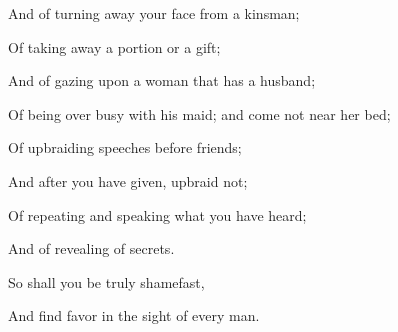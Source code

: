{\par }{\Q {}And of turning away
 your face from a kinsman;
\par }{\Q Of taking away a portion or a gift;
\par }{\Q And of gazing upon a woman that has a husband;
\par }{\Q {}Of being over busy with his maid; and come not near her bed;
\par }{\Q Of upbraiding speeches before friends;
\par }{\Q And after you have given, upbraid not;
\par }{\Q {}Of repeating and speaking what you have heard;
\par }{\Q And of revealing of secrets.
\par }{\Q {}So shall you be truly shamefast,
\par }{\Q And find favor in the sight of every man.
\par }{\BB \par }
